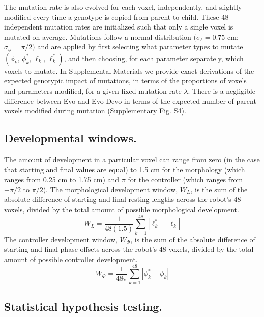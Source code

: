 The mutation rate is also evolved for each voxel, independently, and slightly modified every time a genotype is copied from parent to child.
These 48 independent mutation rates are initialized such that only a single voxel is mutated on average.
Mutations follow a normal distribution $(\sigma_{\ell}=0.75$ cm; $\sigma_{\phi}=\pi/2)$ and are applied by first selecting what parameter types to mutate $(\phi_k,\, \phi_k^*,\, \ell_k,\, \ell_k^*)$, and then choosing, for each parameter separately, which voxels to mutate. 
In Supplemental Materials we provide exact derivations of the expected genotypic impact of mutations, in terms of the proportions of voxels and parameters modified, for a given fixed mutation rate $\lambda$.
There is a negligible difference between Evo and Evo-Devo in terms of the expected number of parent voxels modified during mutation (Supplementary Fig. \hyperref[fig:S4]{S4}).


\subsection{Developmental windows.}

The amount of development in a particular voxel can range from zero (in the case that starting and final values are equal) to 1.5 cm for the morphology (which ranges from 0.25 cm to 1.75 cm) and $\pi$ for the controller (which ranges from $-\pi/2$ to $\pi/2$). 
The morphological development window, $W_L$, is the sum of the absolute difference of starting and final resting lengths across the robot's 48 voxels, divided by the total amount of possible morphological development.
\begin{equation}
W_L = \frac{1}{48(1.5)} \sum_{k=1}^{48} |\ell^*_k-\ell_k|
\label{eq-WL}
\end{equation}
The controller development window, $W_{\Phi}$, is the sum of the absolute difference of starting and final phase offsets across the robot's 48 voxels, divided by the total amount of possible controller development. 
\begin{equation}
W_{\Phi} = \frac{1}{48\pi} \sum_{k=1}^{48} |\phi^*_k-\phi_k|
\label{eq-WPhi}
\end{equation}


\subsection{Statistical hypothesis testing.}

